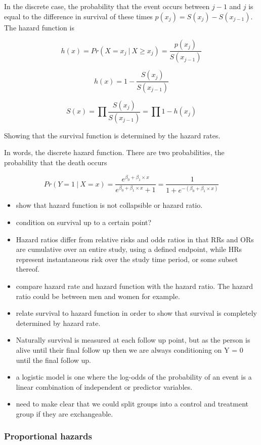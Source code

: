 \documentclass[11pt]{article}
\providecommand{\tightlist}{%
      \setlength{\itemsep}{0pt}\setlength{\parskip}{0pt}}
\begin{document}
In the discrete case, the probability that the event occurs between
\(j-1\) and \(j\) is equal to the difference in survival of these times
\(p(x_j) = S(x_j) - S(x_{j-1})\). The hazard function is

\[h(x) = Pr(X = x_j\ |\ X \ge x_j) = \frac{p(x_j)}{S(x_{j - 1})}\]

\[h(x) = 1 - \frac{S(x_j)}{S(x_{j - 1})}\]

\[S(x) = \prod \frac{S(x_j)}{S(x_{j - 1})} = \prod 1 - h(x_j)\]

Showing that the survival function is determined by the hazard rates.

In words, the discrete hazard function. There are two probabilities, the
probability that the death occurs

\[Pr(Y=1\ |\ X=x) = \frac{e^{\beta_0 + \beta_1 \times x}}{e^{\beta_0 + \beta_1 \times x} + 1} = \frac{1}{1 + e^{-(\beta_0 + \beta_1 \times x)}}\]

\begin{itemize}
\tightlist
\item
  show that hazard function is not collapsible or hazard ratio.
\item
  condition on survival up to a certain point?
\item
  Hazard ratios differ from relative risks and odds ratios in that RRs
  and ORs are cumulative over an entire study, using a defined endpoint,
  while HRs represent instantaneous risk over the study time period, or
  some subset thereof.
\item
  compare hazard rate and hazard function with the hazard ratio. The
  hazard ratio could be between men and women for example.
\item
  relate survival to hazard function in order to show that survival is
  completely determined by hazard rate.
\item
  Naturally survival is measured at each follow up point, but as the
  person is alive until their final follow up then we are always
  conditioning on Y = 0 until the final follow up.
\item
  a logistic model is one where the log-odds of the probability of an
  event is a linear combination of independent or predictor variables.
\item
  need to make clear that we could split groups into a control and
  treatment group if they are exchangeable.
\end{itemize}

\subsubsection{Proportional hazards}\label{proportional-hazards}
\end{document}
